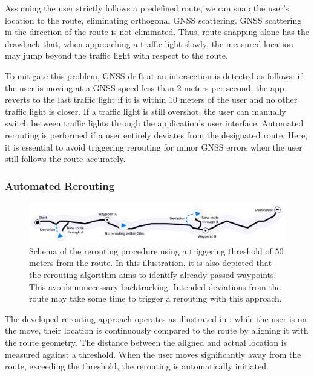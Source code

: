 Assuming the user strictly follows a predefined route, we can snap the user's location to the route, eliminating orthogonal GNSS scattering. GNSS scattering in the direction of the route is not eliminated. Thus, route snapping alone has the drawback that, when approaching a traffic light slowly, the measured location may jump beyond the traffic light with respect to the route. 

To mitigate this problem, GNSS drift at an intersection is detected as follows: if the user is moving at a GNSS speed less than 2 meters per second, the app reverts to the last traffic light if it is within 10 meters of the user and no other traffic light is closer. If a traffic light is still overshot, the user can manually switch between traffic lights through the application's user interface. Automated rerouting is performed if a user entirely deviates from the designated route. Here, it is essential to avoid triggering rerouting for minor GNSS errors when the user still follows the route accurately.

\subsubsection{Automated Rerouting}

\begin{figure}[t]
\centering
\includegraphics[width=\linewidth]{images/rerouting-strategy.pdf}
\caption{Schema of the rerouting procedure using a triggering threshold of 50 meters from the route. In this illustration, it is also depicted that the rerouting algorithm aims to identify already passed waypoints. This avoids unnecessary backtracking. Intended deviations from the route may take some time to trigger a rerouting with this approach.}
\label{fig:rerouting-strategy}
\end{figure}

The developed rerouting approach operates as illustrated in : while the user is on the move, their location is continuously compared to the route by aligning it with the route geometry. The distance between the aligned and actual location is measured against a threshold. When the user moves significantly away from the route, exceeding the threshold, the rerouting is automatically initiated. 

